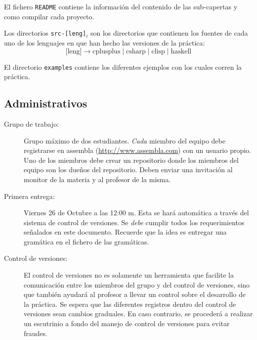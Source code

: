\documentclass{article}
\theoremstyle{definition}
\begin{document}
\begin{description}
  El fichero \texttt{README} contiene la información del contenido de
  las sub-capertas y como compilar cada proyecto.

  Los directorios \texttt{src-[leng]$_i$} son los directorios que
  contienen los fuentes de cada uno de los lenguajes en que han hecho
  las versiones de la práctica:
  \begin{equation*}
    \text{[leng]} \to \text{cplusplus} \mid \text{csharp} \mid \text{clisp} \mid \text{haskell}
  \end{equation*}

  El directorio \texttt{examples} contiene los diferentes ejemplos con
  los cuales corren la práctica.

\end{description}

\subsection{Administrativos}
\label{sec:admin}

\begin{description}
\item[Grupo de trabajo:] Grupo máximo de dos estudiantes. \emph{Cada}
  miembro del equipo debe registrarse en assembla
  (\url{http://www.assembla.com}) con un usuario propio. Uno de los
  miembros debe crear un repositorio donde los miembros del equipo son
  los dueños del repositorio. Deben enviar una invitación al monitor
  de la materia y al profesor de la misma.

\item[Primera entrega:] Viernes 26 de Octubre a las 12:00 m. Esta se
  hará automática a través del sistema de control de versiones. Se
  \emph{debe} cumplir todos los requerimientos señalados en este
  documento. Recuerde que la idea es entregar una gramática en el
  fichero de las gramáticas.

\item[Control de versiones:] El control de versiones no es solamente
  un herramienta que facilite la comunicación entre los miembros del
  grupo y del control de versiones, sino que también ayudará al
  profesor a llevar un control sobre el desarrollo de la práctica. Se
  espera que las diferentes registros dentro del control de versiones
  sean cambios graduales. En caso contrario, se procederá a realizar
  un escutrinio a fondo del manejo de control de versiones para evitar
  fraudes.
\end{description}


\newrefcontext[sorting=nyt]
\printbibliography[heading=bibintoc]
\end{document}
